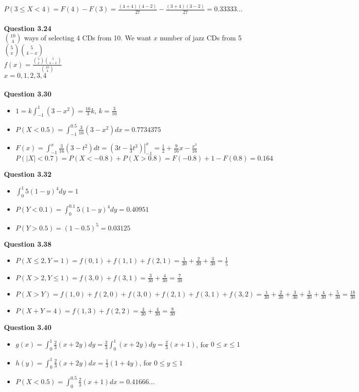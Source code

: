 \documentclass{article}
\begin{document}
    $P(3\leq X<4) = F(4) - F(3) = \frac{(4+4)(4-2)}{27} - \frac{(3+4)(3-2)}{27} = 0.33333...$\\\\
    \textbf{Question 3.24}\\
    $\binom{10}{4}$ ways of selecting 4 CDs from 10. We want $x$ number of jazz CDs from 5 $\binom{5}{x}\binom{5}{4-x}$\\
    $f(x) = \frac{\binom{5}{x}\binom{5}{4-x}}{\binom{10}{4}}$\\
    $x = 0,1,2,3,4$\\\\
    \textbf{Question 3.30}
    \begin{itemize}
        \item $1 = k\int_{-1}^{1}(3-x^2) = \frac{16}{3}k$, $k=\frac{3}{16}$
        \item $P(X<0.5) = \int_{-1}^{0.5}\frac{3}{16}(3-x^2)dx = 0.7734375$
        \item $F(x) = \int_{-1}^{x}\frac{3}{16}(3-t^2)dt = \left.(3t-\frac{1}{3}t^3)\right\vert_{-1}^{x} = \frac{1}{2} + \frac{9}{16}x - \frac{x^3}{16}$\\
              $P(|X|<0.7) = P(X<-0.8) + P(X>0.8) = F(-0.8)+1-F(0.8) = 0.164$
    \end{itemize}
    \textbf{Question 3.32}
    \begin{itemize}
        \item $\int_{0}^{1}5(1-y)^4dy = 1$
        \item $P(Y<0.1) = \int_{0}^{0.1}5(1-y)^4dy = 0.40951$
        \item $P(Y>0.5) = (1-0.5)^5 = 0.03125$
    \end{itemize}
    \textbf{Question 3.38}
    \begin{itemize}
        \item $P(X\leq 2, Y=1) = f(0,1)+f(1,1)+f(2,1) = \frac{1}{30} + \frac{2}{30} + \frac{3}{30} = \frac{1}{5}$
        \item $P(X>2, Y\leq 1) = f(3,0)+f(3,1) = \frac{3}{30} + \frac{4}{30} = \frac{7}{30}$
        \item $P(X>Y) = f(1,0) + f(2,0)+f(3,0)+f(2,1)+f(3,1)+f(3,2) = \frac{1}{30} + \frac{2}{30}+\frac{3}{30}+\frac{3}{30}+\frac{4}{30}+\frac{5}{30}=\frac{18}{30}$
        \item $P(X+Y=4) = f(1,3)+f(2,2) = \frac{4}{30} + \frac{4}{30} = \frac{8}{30}$
    \end{itemize}
    \textbf{Question 3.40}
    \begin{itemize}
        \item $g(x) = \int_{0}^{1}\frac{2}{3}(x+2y)dy = \frac{2}{3}\int_{0}^{1}(x+2y)dy = \frac{2}{3}(x+1)$, for $0\leq x \leq 1$
        \item $h(y) = \int_{0}^{1}\frac{2}{3}(x+2y)dx = \frac{1}{3}(1+4y)$, for $0\leq y \leq 1$
        \item $P(X<0.5)=\int_{0}^{0.5}\frac{2}{3}(x+1)dx = 0.41666...$
    \end{itemize}
\end{document}
